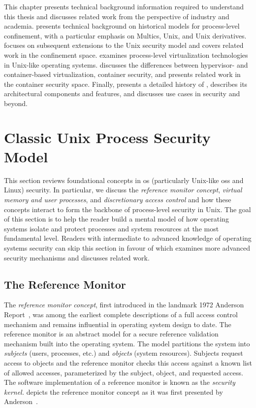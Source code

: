 This chapter presents technical background information required to understand this thesis
and discusses related work from the perspective of industry and academia.
 presents technical background on historical models for
process-level confinement, with a particular emphasis on Multics, Unix, and Unix
derivatives.   focuses on subsequent extensions to the Unix
security model and covers related work in the confinement space. 
examines process-level virtualization technologies in Unix-like operating systems.
 discusses the differences between hypervisor- and container-based
virtualization, container security, and presents related work in the container security
space. Finally,  presents a detailed history of ,
describes its architectural components and features, and discusses use cases in security
and beyond.

\section{Classic Unix Process Security Model}%
\label{s:process-security-model}

This section reviews foundational concepts in \gls{os} (particularly Unix-like \gls{os}s
and Linux) security. In particular, we discuss the \textit{reference monitor concept},
\textit{virtual memory and user processes}, and \textit{discretionary access control} and
how these concepts interact to form the backbone of process-level security in Unix.  The
goal of this section is to help the reader build a mental model of how operating systems
isolate and protect processes and system resources at the most fundamental level. Readers
with intermediate to advanced knowledge of operating systems security can skip this
section in favour of  which examines more advanced security
mechanisms and discusses related work.

\subsection{The Reference Monitor}%
\label{ss:refmon}

The \textit{reference monitor concept}, first introduced in the landmark 1972 Anderson
Report~\cite{anderson1972_report}, was among the earliest complete descriptions of a full
access control mechanism and remains influential in operating system design to date. The
reference monitor is an abstract model for a secure reference validation mechanism built
into the operating system. The model partitions the system into \textit{subjects} (users,
processes, etc.) and \textit{objects} (system resources).  Subjects request access to
objects and the reference monitor checks this access against a known list of allowed
accesses, parameterized by the subject, object, and requested access. The software
implementation of a reference monitor is known as the \textit{security kernel.}
 depicts the reference monitor concept as it was first presented by
Anderson~\cite{anderson1972_report}.

